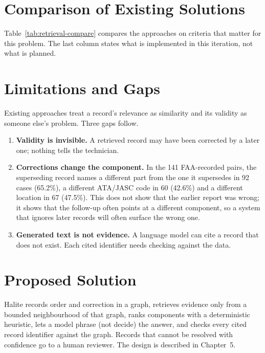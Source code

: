 \section{Comparison of Existing Solutions}

Table~\ref{tab:retrieval-compare} compares the approaches on criteria that matter for this problem. The last column states what is implemented in this iteration, not what is planned.



\section{Limitations and Gaps}

Existing approaches treat a record's relevance as similarity and its validity as someone else's problem. Three gaps follow.

\begin{enumerate}
\item \textbf{Validity is invisible.} A retrieved record may have been corrected by a later one; nothing tells the technician.
\item \textbf{Corrections change the component.} In the 141 FAA-recorded pairs, the superseding record names a different part from the one it supersedes in 92 cases (65.2\%), a different ATA/JASC code in 60 (42.6\%) and a different location in 67 (47.5\%). This does not show that the earlier report was wrong; it shows that the follow-up often points at a different component, so a system that ignores later records will often surface the wrong one.
\item \textbf{Generated text is not evidence.} A language model can cite a record that does not exist. Each cited identifier needs checking against the data.
\end{enumerate}

\section{Proposed Solution}

Halite records order and correction in a graph, retrieves evidence only from a bounded neighbourhood of that graph, ranks components with a deterministic heuristic, lets a model phrase (not decide) the answer, and checks every cited record identifier against the graph. Records that cannot be resolved with confidence go to a human reviewer. The design is described in Chapter~5.

